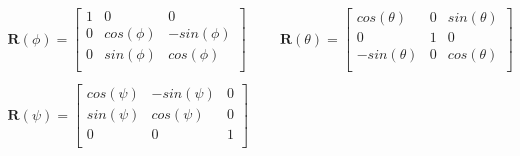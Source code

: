 \documentclass[twoside,11pt]{book}
\begin{document}
\begin{equation}
\begin{array}{c}
\pmb{R}(\phi)=\left[\begin{array}{ccc}
1 & 0 & 0 \\
0 & cos(\phi) & -sin(\phi) \\
0 & sin(\phi) & cos(\phi) \\ \end{array} \right]\hspace{1cm} \pmb{R}(\theta)=\left[\begin{array}{ccc}
cos(\theta) & 0 & sin(\theta) \\
0 & 1 & 0 \\
-sin(\theta) & 0 & cos(\theta) \\ \end{array} \right] \\
\\
\pmb{R}(\psi)=\left[\begin{array}{ccc}
cos(\psi) & -sin(\psi) & 0 \\
sin(\psi) & cos(\psi) & 0 \\
0 & 0 & 1 \\ \end{array} \right] \end{array}
\end{equation}
\end{document}
